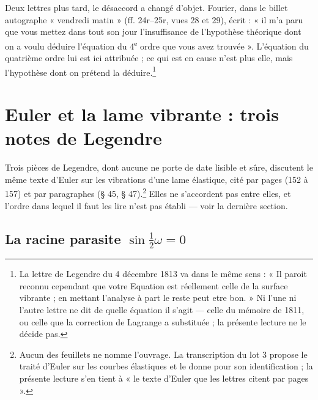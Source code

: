 \documentclass[11pt,a4paper]{article}
\begin{document}
Deux lettres plus tard, le désaccord a changé d'objet. Fourier, dans le billet
autographe « vendredi matin » (ff. 24r–25r, vues 28 et 29), écrit : « il m'a
paru que vous mettez dans tout son jour l'insuffisance de l'hypothèse
théorique dont on a voulu déduire l'équation du 4\textsuperscript{e} ordre que
vous avez trouvée ». L'équation du quatrième ordre lui est ici attribuée ; ce
qui est en cause n'est plus elle, mais l'hypothèse dont on prétend la
déduire.\footnote{La lettre de Legendre du 4 décembre 1813 va dans le même
sens : « Il paroit reconnu cependant que votre Equation est réellement celle de
la surface vibrante ; en mettant l'analyse à part le reste peut etre bon. » Ni
l'une ni l'autre lettre ne dit de quelle équation il s'agit — celle du mémoire
de 1811, ou celle que la correction de Lagrange a substituée ; la présente
lecture ne le décide pas.}

\section*{Euler et la lame vibrante : trois notes de Legendre}

Trois pièces de Legendre, dont aucune ne porte de date lisible et sûre,
discutent le même texte d'Euler sur les vibrations d'une lame élastique, cité
par pages (152 à 157) et par paragraphes (§ 45, § 47).\footnote{Aucun des
feuillets ne nomme l'ouvrage. La transcription du lot 3 propose le traité
d'Euler sur les courbes élastiques et le donne pour son identification ; la
présente lecture s'en tient à « le texte d'Euler que les lettres citent par
pages ».} Elles ne s'accordent pas entre elles, et l'ordre dans lequel il faut
les lire n'est pas établi — voir la dernière section.

\subsection*{La racine parasite $\sin\frac{1}{2}\omega = 0$}
\end{document}
